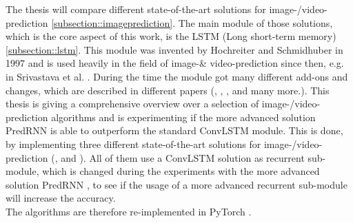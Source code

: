 The thesis will compare different state-of-the-art solutions for image-/video-prediction \ref{subsection::imageprediction}.
The main module of those solutions, which is the core aspect of this work, is the LSTM (Long short-term memory) \ref{subsection::lstm}.
This module was invented by Hochreiter and Schmidhuber  \cite{Hochreiter1997} in 1997 and is used heavily in the field of image-\& video-prediction since then, e.g. in Srivastava et al. 
\cite{Srivastava2015}.
During the time the module got many different add-ons and changes, which are described in different papers (\cite{Patraucean2015}, \cite{Lotter2016}, \cite{Wang2017}, \cite{Wang2018} and many more.). 
This thesis is giving a comprehensive overview over a selection of image-/video-prediction algorithms and is experimenting if the more advanced solution PredRNN \cite{Wang2017} is able to outperform the standard ConvLSTM module. This is done, by implementing
three different state-of-the-art solutions for image-/video-prediction (\cite{Shi2015}, \cite{Patraucean2015} and \cite{Lotter2016}).
All of them use a ConvLSTM solution as recurrent sub-module, which is changed during the experiments
with the more advanced solution PredRNN \cite{Wang2017}, to see if the usage of a more advanced recurrent sub-module will increase the accuracy.\\
The algorithms are therefore re-implemented in PyTorch \cite{Paszke2019}.
